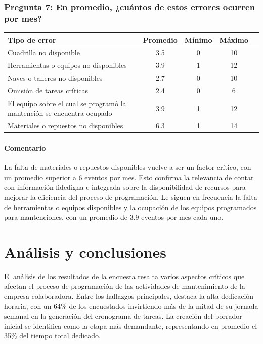 \documentclass{article}
\begin{document}
\begin{appendix}
    \vspace{1.5em}
    \subsubsection*{Pregunta 7: En promedio, ¿cuántos de estos errores ocurren por mes?}
    
    \begin{table}[htbp]
        \centering
        \begin{tabular}{p{7cm}cccc}
            \toprule
            \textbf{Tipo de error} & \textbf{Promedio} & \textbf{Mínimo} & \textbf{Máximo} \\
            \midrule
            Cuadrilla no disponible & 3.5 & 0 & 10 \\
            Herramientas o equipos no disponibles & 3.9 & 1 & 12 \\
            Naves o talleres no disponibles & 2.7 & 0 & 10 \\
            Omisión de tareas críticas & 2.4 & 0 & 6 \\
            El equipo sobre el cual se programó la mantención se encuentra ocupado & 3.9 & 1 & 12 \\
            Materiales o repuestos no disponibles & 6.3 & 1 & 14 \\
            \bottomrule
        \end{tabular}
        \label{tab:errores_especificos}
    \end{table}
    
    \paragraph{Comentario}La falta de materiales o repuestos disponibles vuelve a ser un factor crítico, con un promedio superior a 6 eventos por mes. Esto confirma la relevancia de contar con información fidedigna e integrada sobre la disponibilidad de recursos para mejorar la eficiencia del proceso de programación. Le siguen en frecuencia la falta de herramientas o equipos disponibles y la ocupación de los equipos programados para mantenciones, con un promedio de 3.9 eventos por mes cada uno.
    
    \section*{Análisis y conclusiones}
    
    El análisis de los resultados de la encuesta resalta varios aspectos críticos que afectan el proceso de programación de las actividades de mantenimiento de la empresa colaboradora. Entre los hallazgos principales, destaca la alta dedicación horaria, con un 64\% de los encuestados invirtiendo más de la mitad de su jornada semanal en la generación del cronograma de tareas. La creación del borrador inicial se identifica como la etapa más demandante, representando en promedio el 35\% del tiempo total dedicado.
    

\end{appendix}
\end{document}
